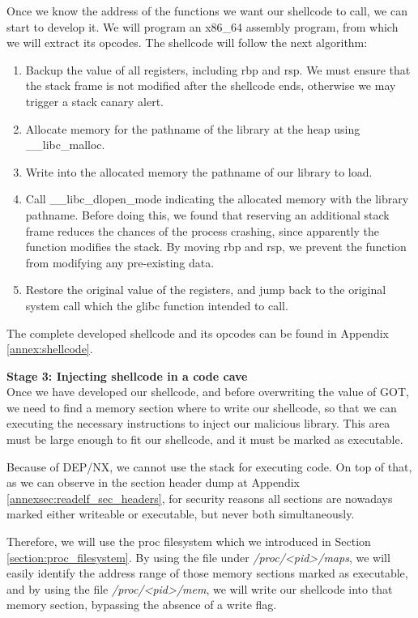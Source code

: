 Once we know the address of the functions we want our shellcode to call, we can start to develop it. We will program an x86\_64 assembly program, from which we will extract its opcodes. The shellcode will follow the next algorithm:
\begin{enumerate}
\item Backup the value of all registers, including rbp and rsp. We must ensure that the stack frame is not modified after the shellcode ends, otherwise we may trigger a stack canary alert.
\item Allocate memory for the pathname of the library at the heap using \_\_libc\_malloc.
\item Write into the allocated memory the pathname of our library to load.
\item Call \_\_libc\_dlopen\_mode indicating the allocated memory with the library pathname. Before doing this, we found that reserving an additional stack frame reduces the chances of the process crashing, since apparently the function modifies the stack. By moving rbp and rsp, we prevent the function from modifying any pre-existing data.
\item Restore the original value of the registers, and jump back to the original system call which the glibc function intended to call.
\end{enumerate}

The complete developed shellcode and its opcodes can be found in Appendix \ref{annex:shellcode}.


\textbf{Stage 3: Injecting shellcode in a code cave}\\
Once we have developed our shellcode, and before overwriting the value of GOT, we need to find a memory section where to write our shellcode, so that we can executing the necessary instructions to inject our malicious library. This area must be large enough to fit our shellcode, and it must be marked as executable. 

Because of DEP/NX, we cannot use the stack for executing code. On top of that, as we can observe in the section header dump at Appendix \ref{annexsec:readelf_sec_headers}, for security reasons all sections are nowadays marked either writeable or executable, but never both simultaneously.

Therefore, we will use the proc filesystem which we introduced in Section \ref{section:proc_filesystem}. By using the file under \textit{/proc/<pid>/maps}, we will easily identify the address range of those memory sections marked as executable, and by using the file \textit{/proc/<pid>/mem}, we will write our shellcode into that memory section, bypassing the absence of a write flag.

